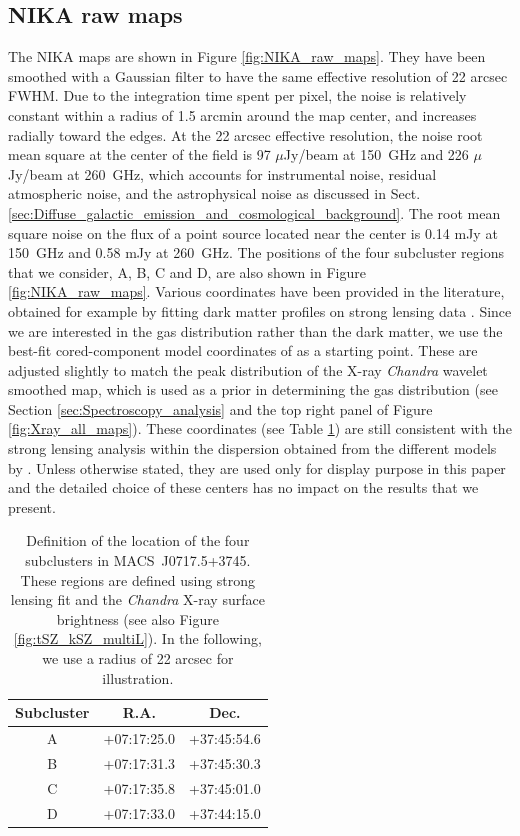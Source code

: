 \documentclass[twocolumn,traditabstract]{aa}
\begin{document}
\subsection{NIKA raw maps}\label{sec:NIKA_raw_maps}
The NIKA maps are shown in Figure \ref{fig:NIKA_raw_maps}. They have been smoothed with a Gaussian filter to have the same effective resolution of 22 arcsec FWHM. Due to the integration time spent per pixel, the noise is relatively constant within a radius of 1.5 arcmin around the map center, and increases radially toward the edges. At the 22 arcsec effective resolution, the noise root mean square at the center of the field is 97 $\mu$Jy/beam at 150~GHz and 226 $\mu$Jy/beam at 260~GHz, which accounts for instrumental noise, residual atmospheric noise, and the astrophysical noise as discussed in Sect.~ \ref{sec:Diffuse_galactic_emission_and_cosmological_background}. The root mean square noise on the flux of a point source located near the center is 0.14 mJy at 150~GHz and 0.58 mJy at 260~GHz. The positions of the four subcluster regions that we consider, A, B, C and D, are also shown in Figure \ref{fig:NIKA_raw_maps}. Various coordinates have been provided in the literature, obtained for example by fitting dark matter profiles on strong lensing data \citep[e.g.,][]{Limousin2012,Limousin2015}. Since we are interested in the gas distribution rather than the dark matter, we use the best-fit cored-component model coordinates of \cite{Limousin2015} as a starting point. These are adjusted slightly to match the peak distribution of the X-ray \textit{Chandra} wavelet smoothed map, which is used as a prior in determining the gas distribution (see Section \ref{sec:Spectroscopy_analysis} and the top right panel of Figure \ref{fig:Xray_all_maps}). These coordinates (see Table \ref{tab:coord_region}) are still consistent with the strong lensing analysis within the dispersion obtained from the different models by \cite{Limousin2015}. Unless otherwise stated, they are used only for display purpose in this paper and the detailed choice of these centers has no impact on the results that we present.

\begin{table}[]
\caption{\footnotesize{Definition of the location of the four subclusters in \mbox{MACS~J0717.5+3745}. These regions are defined using \cite{Limousin2015} strong lensing fit and the \textit{Chandra} X-ray surface brightness (see also Figure \ref{fig:tSZ_kSZ_multiL}). In the following, we use a radius of 22 arcsec for illustration.}}
\begin{center}
\begin{tabular}{ccc}
\hline
\hline
Subcluster & R.A. & Dec. \\
\hline
A & +07:17:25.0 & +37:45:54.6 \\
B & +07:17:31.3 & +37:45:30.3 \\
C & +07:17:35.8 & +37:45:01.0 \\
D & +07:17:33.0 & +37:44:15.0 \\
\hline
\end{tabular}
\end{center}
\label{tab:coord_region}
\end{table}
\end{document}
